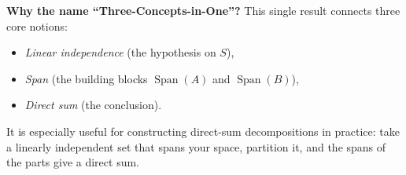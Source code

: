 \begin{policynote}
\textbf{Why the name ``Three-Concepts-in-One''?}
This single result connects three core notions:
\begin{itemize}[leftmargin=*]
\item \emph{Linear independence} (the hypothesis on $S$),
\item \emph{Span} (the building blocks $\operatorname{Span}(A)$ and $\operatorname{Span}(B)$),
\item \emph{Direct sum} (the conclusion).
\end{itemize}
It is especially useful for constructing direct-sum decompositions in practice: take a linearly independent set that spans your space, partition it, and the spans of the parts give a direct sum.
\end{policynote}


